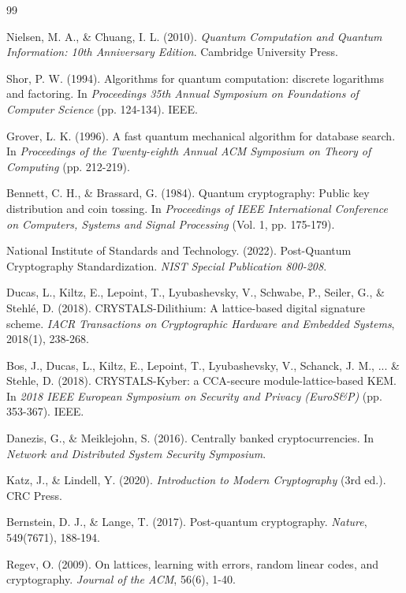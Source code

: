 \documentclass[11pt,a4paper]{article}
\begin{document}
\begin{thebibliography}{99}

Nielsen, M. A., \& Chuang, I. L. (2010).
\textit{Quantum Computation and Quantum Information: 10th Anniversary Edition}.
Cambridge University Press.

Shor, P. W. (1994).
Algorithms for quantum computation: discrete logarithms and factoring.
In \textit{Proceedings 35th Annual Symposium on Foundations of Computer Science} (pp. 124-134). IEEE.

Grover, L. K. (1996).
A fast quantum mechanical algorithm for database search.
In \textit{Proceedings of the Twenty-eighth Annual ACM Symposium on Theory of Computing} (pp. 212-219).

Bennett, C. H., \& Brassard, G. (1984).
Quantum cryptography: Public key distribution and coin tossing.
In \textit{Proceedings of IEEE International Conference on Computers, Systems and Signal Processing} (Vol. 1, pp. 175-179).

National Institute of Standards and Technology. (2022).
Post-Quantum Cryptography Standardization.
\textit{NIST Special Publication 800-208}.

Ducas, L., Kiltz, E., Lepoint, T., Lyubashevsky, V., Schwabe, P., Seiler, G., \& Stehlé, D. (2018).
CRYSTALS-Dilithium: A lattice-based digital signature scheme.
\textit{IACR Transactions on Cryptographic Hardware and Embedded Systems}, 2018(1), 238-268.

Bos, J., Ducas, L., Kiltz, E., Lepoint, T., Lyubashevsky, V., Schanck, J. M., ... \& Stehle, D. (2018).
CRYSTALS-Kyber: a CCA-secure module-lattice-based KEM.
In \textit{2018 IEEE European Symposium on Security and Privacy (EuroS\&P)} (pp. 353-367). IEEE.

Danezis, G., \& Meiklejohn, S. (2016).
Centrally banked cryptocurrencies.
In \textit{Network and Distributed System Security Symposium}.

Katz, J., \& Lindell, Y. (2020).
\textit{Introduction to Modern Cryptography} (3rd ed.).
CRC Press.

Bernstein, D. J., \& Lange, T. (2017).
Post-quantum cryptography.
\textit{Nature}, 549(7671), 188-194.

Regev, O. (2009).
On lattices, learning with errors, random linear codes, and cryptography.
\textit{Journal of the ACM}, 56(6), 1-40.


\end{thebibliography}
\end{document}
